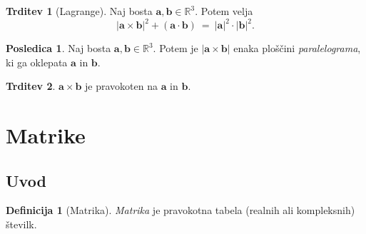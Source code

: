 \documentclass[11pt]{article}
\newcommand{\R}{\mathbb{R}}
\renewcommand{\a}{\mathbf{a}}
\renewcommand{\b}{\mathbf{b}}
\newcommand{\0}{\mathbf{0}}
\theoremstyle{definition}
\newtheorem{definicija}{Definicija}[section]
\theoremstyle{definition}
\newtheorem{trditev}{Trditev}[section]
\theoremstyle{definition}
\theoremstyle{definition}
\newtheorem*{posledica}{Posledica}
\begin{document}
\begin{trditev}[Lagrange]

Naj bosta $\a,\b \in \R^3$. Potem velja
$$|\a\times\b|^2 + (\a\cdot\b) ~=~ |\a|^2 \cdot |\b|^2.$$

\end{trditev}
\vspace{0.5cm}

\begin{posledica}

Naj bosta $\a,\b \in \R^3$. Potem je $|\a\times\b|$ enaka ploščini \textit{paralelograma}, ki ga oklepata $\a$ in $\b$.

\end{posledica}
\vspace{0.5cm}

\begin{trditev}

$\a\times\b$ je pravokoten na $\a$ in $\b$.

\end{trditev}
\vspace{0.5cm}

\pagebreak


\section{Matrike}
\vspace{0.5cm}


\subsection{Uvod}
\vspace{0.5cm}

\begin{definicija}[Matrika]

\textit{Matrika} je pravokotna tabela (realnih ali kompleksnih) številk.

\end{definicija}
\vspace{0.5cm}
\end{document}
